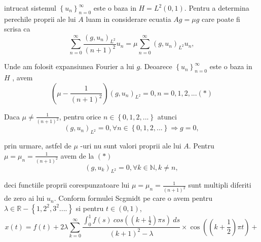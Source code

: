 \documentclass[a4paper,12pt,oneside]{report}
\begin{document}
\begin{enumerate}
		      	intrucat sistemul \(\left \{ u_{n} \right \}_{n=0}^{\infty }\) este o baza in \(H = L^{2}\left ( 0,1 \right )\). Pentru a determina perechile proprii ale lui \(A\) luam in considerare ecuatia 
		      	\(Ag = \mu g\) care poate fi scrisa ca 
		      	\begin{displaymath}
		      		\sum_{n = 0}^{\infty }\frac{\left ( g, u_{n} \right )_{L^{2}}}{\left ( n+1 \right )^{2}}u_{n} = \mu \sum_{n = 0}^{\infty }\left ( g, u_{n} \right )_{L^{2}}u_{n}, 
		      	\end{displaymath}
		      			      			      	
		      	Unde am folosit expansiunea Fourier a lui \(g\). Deoarece \(\left \{ u_{n} \right \}_{n = 0}^{\infty }\) este o baza in \(H\) , avem 
		      	\begin{displaymath}
		      		\left ( \mu  - \frac{1}{\left ( n+1 \right )^{2}} \right )\left ( g,u_{n} \right )_{L^{2}} = 0, n = 0,1,2,... (*)
		      	\end{displaymath}
		      			      			      	
		      	Daca \(\mu \neq \frac{1}{\left ( n+1 \right )^{2}}\), pentru orice \(n\in \left \{ 0,1,2,... \right \}\)  atunci 
		      	\begin{displaymath}
		      		\left ( g,u_{n} \right )_{L^{2}} = 0, \forall n\in \left \{ 0,1,2,... \right \}\Rightarrow g = 0,
		      	\end{displaymath}
		      			      			      	
		      	prin urmare, astfel de  \(\mu\)  -uri nu sunt valori proprii ale lui \(A\). Pentru \(\mu   = \mu _{n} = \frac{1}{\left ( n+1 \right )^{2}}\) avem de la \((*) \)
		      	\begin{displaymath}
		      		\left ( g,u_{k} \right )_{L^{2}} = 0, \forall k\in \mathbb{N}, k\neq n,
		      	\end{displaymath}
		      			      			      	 
		      	deci functiile proprii corespunzatoare lui  \(\mu   = \mu _{n} = \frac{1}{\left ( n+1 \right )^{2}}\) sunt multipli diferiti de zero ai lui \(u_{n}\). 
		      	Conform formulei Scgmidt pe care o avem pentru \(\lambda \in \mathbb{R}- \left \{ 1,2^{2},3^{2}.... \right \}\) si pentru \(t \in \left ( 0,1 \right )\), 
		      	\begin{displaymath}
		      		x\left ( t \right ) = f\left ( t \right ) + 2\lambda\sum_{k=0}^{\infty }\frac{\int_{0}^{1}f\left ( s \right )\ cos\left ( \left ( k+\frac{1}{2} \right )\pi s \right ) \ ds}{\left ( k+1 \right )^{2} -\lambda } \times \cos \left ( \left ( k+\frac{1}{2} \right )\pi t \right ) +
		      	\end{displaymath}
		      			      	

\end{enumerate}
\end{document}
